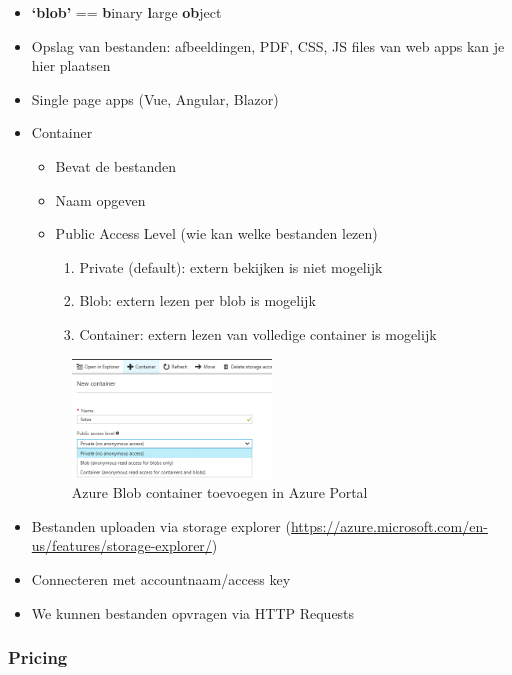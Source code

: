 \documentclass{article}
\newcommand{\bold}[1]{\textbf{#1}}
\begin{document}
\begin{itemize}
    \item \bold{`blob'} == \bold{b}inary \bold{l}arge \bold{ob}ject
    \item Opslag van bestanden: afbeeldingen, PDF, CSS, JS files van web apps kan je hier plaatsen
    \item Single page apps (Vue, Angular, Blazor)
    \item Container
    \begin{itemize}
        \item Bevat de bestanden
        \item Naam opgeven
        \item Public Access Level (wie kan welke bestanden lezen)
        \begin{enumerate}
            \item Private (default): extern bekijken is niet mogelijk
            \item Blob: extern lezen per blob is mogelijk
            \item Container: extern lezen van volledige container is mogelijk
        \end{enumerate}
    \end{itemize}
    \begin{figure}[H]
        \centering
        \includegraphics[width=0.5\textwidth]{azure-blob-container.png}
        \caption{Azure Blob container toevoegen in Azure Portal}
    \end{figure}
    \item Bestanden uploaden via storage explorer (\url{https://azure.microsoft.com/en-us/features/storage-explorer/})
    \item Connecteren met accountnaam/access key
    \item We kunnen bestanden opvragen via HTTP Requests
\end{itemize}

\subsubsection{Pricing}
\end{document}
